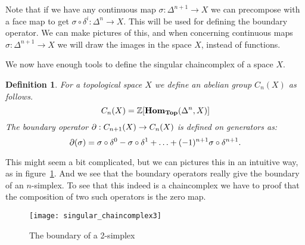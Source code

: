 \documentclass[12pt]{amsproc}
\newtheorem{definition}[theorem]{Definition}
\begin{document}
Note that if we have any continuous map $\sigma : \Delta^{n+1} \to X$ we can precompose with a face map to get $\sigma \circ \delta^i : \Delta^n \to X$. This will be used for defining the boundary operator. We can make pictures of this, and when concerning continuous maps $\sigma : \Delta^{n+1} \to X$ we will draw the images in the space $X$, instead of functions.



We now have enough tools to define the singular chaincomplex of a space $X$.

\begin{definition}
	For a topological space $X$ we define an abelian group $C_n(X)$ as follows.
	$$ C_n(X) = \mathbb{Z}[\mathbf{Hom}_{\mathbf{Top}}(\Delta^n, X)] $$
	The boundary operator $\partial : C_{n+1}(X) \to C_n(X)$ is defined on generators as:
	$$ \partial(\sigma) = \sigma \circ \delta^0 - \sigma \circ \delta^1 + \ldots + (-1)^{n+1} \sigma \circ \delta^{n+1}.$$
\end{definition}

This might seem a bit complicated, but we can pictures this in an intuitive way, as in figure~\ref{fig:singular_chaincomplex3}. And we see that the boundary operators really give the boundary of an $n$-simplex. To see that this indeed is a chaincomplex we have to proof that the composition of two such operators is the zero map.
\begin{figure}
	\label{fig:singular_chaincomplex3}
	\texttt{[image: singular\_chaincomplex3]}
	\caption{The boundary of a 2-simplex}
\end{figure}


% 
% 	
\end{document}
